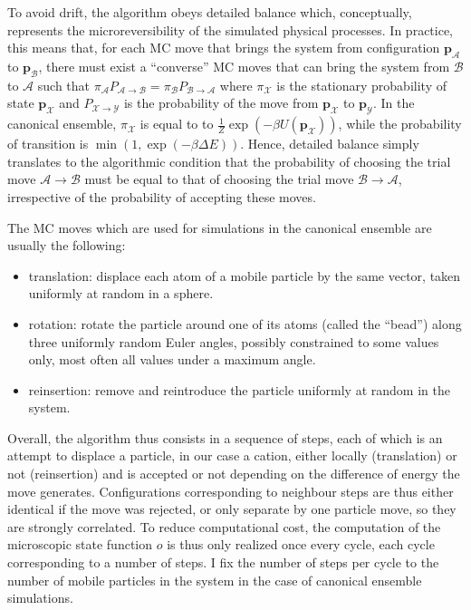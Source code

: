 \documentclass[main.tex]{subfiles}
\begin{document}
To avoid drift, the algorithm obeys detailed balance which, conceptually, represents the microreversibility of the simulated physical processes. In practice, this means that, for each MC move that brings the system from configuration ${\boldsymbol p}_\mathcal{A}$ to ${\boldsymbol p}_\mathcal{B}$, there must exist a ``converse'' MC moves that can bring the system from $\mathcal{B}$ to $\mathcal{A}$ such that $\pi_\mathcal{A} P_{\mathcal{A}\to \mathcal{B}} = \pi_\mathcal{B} P_{\mathcal{B}\to \mathcal{A}}$ where $\pi_\mathcal{X}$ is the stationary probability of state ${\boldsymbol p}_\mathcal{X}$ and $P_{\mathcal{X}\to \mathcal{Y}}$ is the probability of the move from ${\boldsymbol p}_\mathcal{X}$ to ${\boldsymbol p}_\mathcal{Y}$. In the canonical ensemble, $\pi_\mathcal{X}$ is equal to to $\frac1Z\exp\left(-\beta U\left({\boldsymbol p}_\mathcal{X}\right)\right)$, while the probability of transition is $\min\left(1, \exp\left(-\beta \Delta E\right)\right)$. Hence, detailed balance simply translates to the algorithmic condition that the probability of choosing the trial move $\mathcal{A}\to \mathcal{B}$ must be equal to that of choosing the trial move $\mathcal{B}\to \mathcal{A}$, irrespective of the probability of accepting these moves.

The MC moves which are used for simulations in the canonical ensemble are usually the following:
\begin{itemize}
    \item translation: displace each atom of a mobile particle by the same vector, taken uniformly at random in a sphere.
    \item rotation: rotate the particle around one of its atoms (called the ``bead'') along three uniformly random Euler angles, possibly constrained to some values only, most often all values under a maximum angle.
    \item reinsertion: remove and reintroduce the particle uniformly at random in the system.
\end{itemize}

Overall, the algorithm thus consists in a sequence of steps, each of which is an attempt to displace a particle, in our case a cation, either locally (translation) or not (reinsertion) and is accepted or not depending on the difference of energy the move generates. Configurations corresponding to neighbour steps are thus either identical if the move was rejected, or only separate by one particle move, so they are strongly correlated. To reduce computational cost, the computation of the microscopic state function $o$ is thus only realized once every cycle, each cycle corresponding to a number of steps. I fix the number of steps per cycle to the number of mobile particles in the system in the case of canonical ensemble simulations.
\end{document}
